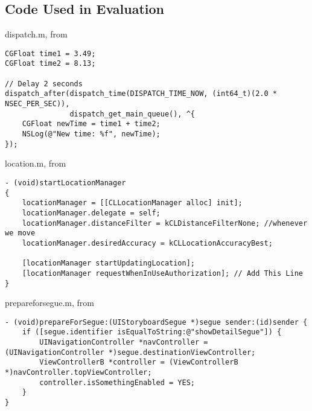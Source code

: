 \documentclass{sfuthesis}
\begin{document}

%
%
%
%
%

\backmatter%
	
	

\begin{appendices}

\chapter{Code Used in Evaluation}\label{chap:evaluationcode}

\begin{listing}
\caption{dispatch.m, from \cite{so4139219}}
\begin{verbatim}
CGFloat time1 = 3.49;
CGFloat time2 = 8.13;

// Delay 2 seconds
dispatch_after(dispatch_time(DISPATCH_TIME_NOW, (int64_t)(2.0 * NSEC_PER_SEC)),
               dispatch_get_main_queue(), ^{
    CGFloat newTime = time1 + time2;
    NSLog(@"New time: %f", newTime);
});
\end{verbatim}
\end{listing}

\begin{listing}
\caption{location.m, from \cite{so24062509}}
\begin{verbatim}
- (void)startLocationManager
{
    locationManager = [[CLLocationManager alloc] init];
    locationManager.delegate = self;
    locationManager.distanceFilter = kCLDistanceFilterNone; //whenever we move
    locationManager.desiredAccuracy = kCLLocationAccuracyBest;

    [locationManager startUpdatingLocation];
    [locationManager requestWhenInUseAuthorization]; // Add This Line
}
\end{verbatim}
\end{listing}

\begin{listing}
\caption{prepareforsegue.m, from \cite{so5210535}}
\begin{verbatim}
- (void)prepareForSegue:(UIStoryboardSegue *)segue sender:(id)sender {
    if ([segue.identifier isEqualToString:@"showDetailSegue"]) {
        UINavigationController *navController = (UINavigationController *)segue.destinationViewController;
        ViewControllerB *controller = (ViewControllerB *)navController.topViewController;
        controller.isSomethingEnabled = YES;
    }
}
\end{verbatim}
\end{listing}


\end{appendices}
\end{document}
